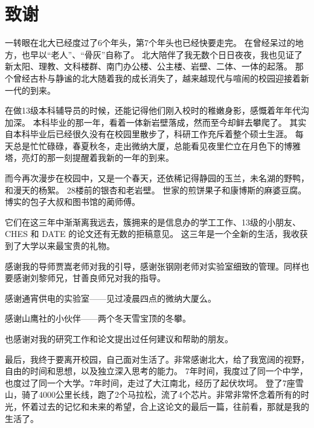 
\chapter{致谢}
一转眼在北大已经度过了6个年头，第7个年头也已经快要走完。
在曾经呆过的地方，也早以``老人''、``骨灰''自称了。
北大陪伴了我无数个日日夜夜，我也见证了新太阳、理教、文科楼群、南门办公楼、公主楼、岩壁、二体、一体的起落。
那个曾经古朴与静谧的北大随着我的成长消失了，越来越现代与喧闹的校园迎接着新一代的到来。

在做13级本科辅导员的时候，还能记得他们刚入校时的稚嫩身影，感慨着年年代沟加深。
本科毕业的那一年，看着一体新岩壁落成，然而至今却鲜去攀爬了。
其实自本科毕业后已经很久没有在校园里散步了，科研工作充斥着整个硕士生涯。
每天总是忙忙碌碌，春夏秋冬，走出微纳大厦，总能看见夜里伫立在月色下的博雅塔，亮灯的那一刻提醒着我新的一年的到来。

而今再次漫步在校园中，又是一个春天，还依稀记得静园的玉兰，未名湖的野鸭，和漫天的杨絮。
28楼前的银杏和老岩壁。
世家的煎饼果子和康博斯的麻婆豆腐。
博实的包子大叔和图书馆的蔺师傅。

它们在这三年中渐渐离我远去，簇拥来的是信息办的学工工作、13级的小朋友、CHES 和 DATE 的论文还有无数的拒稿意见。
这三年是一个全新的生活，我收获到了大学以来最宝贵的礼物。

感谢我的导师贾嵩老师对我的引导，感谢张钢刚老师对实验室细致的管理。同样也要感谢刘黎师兄，甘善良师兄对我的指导。

感谢通宵供电的实验室——见过凌晨四点的微纳大厦么。

感谢山鹰社的小伙伴——两个冬天雪宝顶的冬攀。

也感谢对我的研究工作和论文提出过任何建议和帮助的朋友。

最后，我终于要离开校园，自己面对生活了。非常感谢北大，给了我宽阔的视野，自由的时间和思想，以及独立深入思考的能力。
7年时间，我度过了同一个中学，也度过了同一个大学。7年时间，走过了大江南北，经历了起伏坎坷。
登了7座雪山，骑了4000公里长线，跑了2个马拉松，流了4个芯片。非常非常怀念着所有的时光，怀着过去的记忆和未来的希望，合上这论文的最后一篇，往前看，那就是我的生活了。

